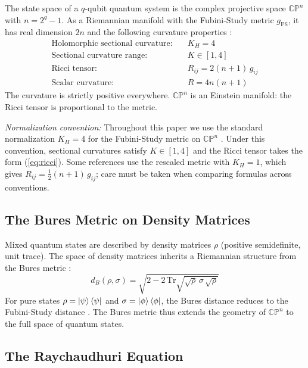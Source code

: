 \documentclass[12pt,a4paper]{article}
\begin{document}
The state space of a $q$-qubit quantum system is the complex projective space $\mathbb{CP}^n$ with $n = 2^q - 1$. As a Riemannian manifold with the Fubini-Study metric $g_{\text{FS}}$, it has real dimension $2n$ and the following curvature properties \cite{bengtsson2006,kobayashi1969}:
\begin{align}
    \text{Holomorphic sectional curvature:} \quad & K_H = 4 \label{eq:holo_curv} \\
    \text{Sectional curvature range:} \quad & K \in [1, 4] \label{eq:curv_range} \\
    \text{Ricci tensor:} \quad & R_{ij} = 2(n+1)\, g_{ij} \label{eq:ricci} \\
    \text{Scalar curvature:} \quad & R = 4n(n+1) \label{eq:scalar}
\end{align}
The curvature is strictly positive everywhere. $\mathbb{CP}^n$ is an Einstein manifold: the Ricci tensor is proportional to the metric.

\textit{Normalization convention:} Throughout this paper we use the standard normalization $K_H = 4$ for the Fubini-Study metric on $\mathbb{CP}^n$ \cite{kobayashi1969,bengtsson2006}. Under this convention, sectional curvatures satisfy $K \in [1,4]$ and the Ricci tensor takes the form (\ref{eq:ricci}). Some references use the rescaled metric with $K_H = 1$, which gives $R_{ij} = \tfrac{1}{2}(n+1)\,g_{ij}$; care must be taken when comparing formulas across conventions.

\subsection{The Bures Metric on Density Matrices}

Mixed quantum states are described by density matrices $\rho$ (positive semidefinite, unit trace). The space of density matrices inherits a Riemannian structure from the Bures metric \cite{bures1969,hubner1992}:
\begin{equation}
    d_B(\rho, \sigma) = \sqrt{2 - 2\,\text{Tr}\sqrt{\sqrt{\rho}\,\sigma\,\sqrt{\rho}}}
    \label{eq:bures_dist}
\end{equation}
For pure states $\rho = \ket{\psi}\bra{\psi}$ and $\sigma = \ket{\phi}\bra{\phi}$, the Bures distance reduces to the Fubini-Study distance \cite{bengtsson2006}. The Bures metric thus extends the geometry of $\mathbb{CP}^n$ to the full space of quantum states.

\subsection{The Raychaudhuri Equation}
\end{document}
